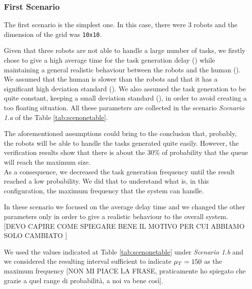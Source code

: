 \subsubsection{First Scenario} \label{firstscenario}
The first scenario is the simplest one. In this case, there were 3 robots and the dimension of the grid was \texttt{10x10}.

Given that three robots are not able to handle a large number of tasks, we firstly chose to give a high average time for the task generation delay (\mT) while maintaining a general realistic behaviour between the robots and the human (\mH). We assumed that the human is slower than the robots and that it has a significant high deviation standard (\vH). We also assumed the task generation to be quite constant, keeping a small deviation standard (\vT), in order to avoid creating a too floating situation. All these parameters are collected in the scenario \emph{Scenario 1.a} of the Table \ref{tab:scenonetable}.

The aforementioned assumptions could bring to the conclusion that, probably, the robots will be able to handle the tasks generated quite easily. However, the verification results show that there is about the 30\% of probability that the queue will reach the maximum size.
\\

As a consequence, we decreased the task generation frequency until the result reached a low probability. We did that to understand what is, in this configuration, the maximum frequency that the system can handle.

In these scenario we focused on the average delay time \mT \space and we changed the other parameters only in order to give a realistic behaviour to the overall system. [DEVO CAPIRE COME SPIEGARE BENE IL MOTIVO PER CUI ABBIAMO SOLO CAMBIATO \mT]

We used the values indicated at Table \ref{tab:scenonetable} under \emph{Scenario 1.b} and we considered the resulting interval sufficient to indicate $\mu_T = 150$ as the maximum frequency [NON MI PIACE LA FRASE, praticamente ho spiegato che grazie a quel range di probabilità, a noi va bene così].
\\

